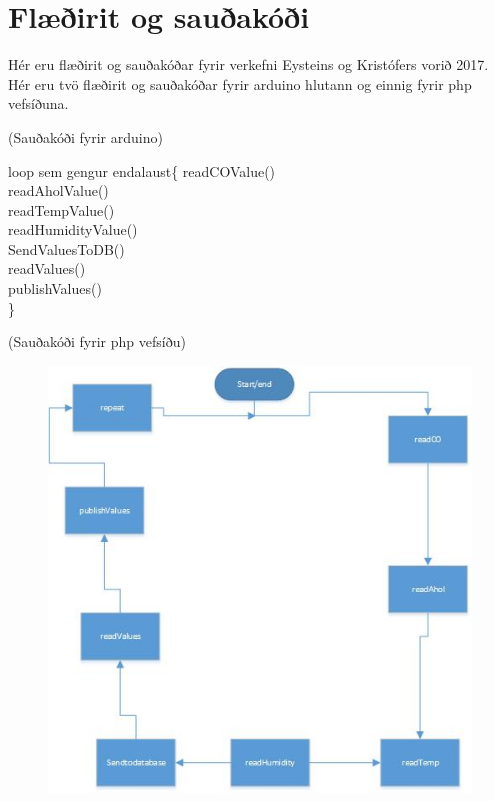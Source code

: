 \section{Flæðirit og sauðakóði} Hér eru flæðirit og sauðakóðar fyrir verkefni Eysteins og Kristófers vorið 2017.  Hér eru tvö flæðirit og sauðakóðar fyrir arduino hlutann og einnig fyrir php vefsíðuna.   
 
(Sauðakóði fyrir arduino)

loop sem gengur endalaust\{
  readCOValue()\\
  readAholValue()\\
  readTempValue()\\
  readHumidityValue()\\
  
  SendValuesToDB()\\
  readValues()\\
  publishValues()\\
\}

(Sauðakóði fyrir php vefsíðu)







\begin{figure}[h]
\includegraphics[scale=.3]{img/Fchatarduinomynd}
\end{figure}

